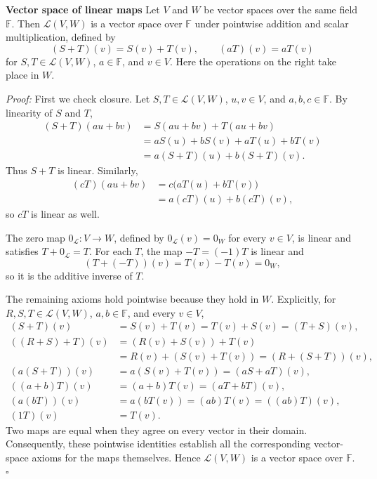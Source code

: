 \documentclass[a4paper,11pt,abstract=true]{scrartcl}
\theoremstyle{dotlessP}
\theoremstyle{dotlessS}
\theoremstyle{remark}
\theoremstyle{definition}
\begin{document}
\begin{problem_box}
\textbf{Vector space of linear maps}
Let $V$ and $W$
be vector spaces over the same field $\mathbb{F}$. Then
$\mathcal{L}(V,W)$ is a vector space over $\mathbb{F}$ under pointwise
addition and scalar multiplication, defined by
\[
(S+T)(v)=S(v)+T(v),
\qquad (aT)(v)=aT(v)
\]
for $S,T\in\mathcal{L}(V,W)$, $a\in\mathbb{F}$, and $v\in V$.
Here the operations on the right take place in $W$.
\end{problem_box}

\begin{claim_box}
\textit{Proof:} First we check closure. Let $S,T\in\mathcal{L}(V,W)$,
$u,v\in V$, and $a,b,c\in\mathbb{F}$. By linearity of $S$ and $T$,
\[
\begin{aligned}
(S+T)(au+bv)
&=S(au+bv)+T(au+bv)\\
&=aS(u)+bS(v)+aT(u)+bT(v)\\
&=a(S+T)(u)+b(S+T)(v).
\end{aligned}
\]
Thus $S+T$ is linear. Similarly,
\[
\begin{aligned}
(cT)(au+bv)
&=c\bigl(aT(u)+bT(v)\bigr)\\
&=a(cT)(u)+b(cT)(v),
\end{aligned}
\]
so $cT$ is linear as well.

The zero map $0_{\mathcal{L}}:V\longrightarrow W$, defined by
$0_{\mathcal{L}}(v)=0_W$ for every $v\in V$, is linear and satisfies
$T+0_{\mathcal{L}}=T$. For each $T$, the map $-T=(-1)T$ is linear and
\[
(T+(-T))(v)=T(v)-T(v)=0_W,
\]
so it is the additive inverse of $T$.

The remaining axioms hold pointwise because they hold in $W$. Explicitly,
for $R,S,T\in\mathcal{L}(V,W)$, $a,b\in\mathbb{F}$, and every $v\in V$,
\[
\begin{aligned}
(S+T)(v)&=S(v)+T(v)=T(v)+S(v)=(T+S)(v),\\
((R+S)+T)(v)&=(R(v)+S(v))+T(v)\\
&=R(v)+(S(v)+T(v))=(R+(S+T))(v),\\
(a(S+T))(v)&=a(S(v)+T(v))=(aS+aT)(v),\\
((a+b)T)(v)&=(a+b)T(v)=(aT+bT)(v),\\
(a(bT))(v)&=a(bT(v))=(ab)T(v)=((ab)T)(v),\\
(1T)(v)&=T(v).
\end{aligned}
\]
Two maps are equal when they agree on every vector in their domain.
Consequently, these pointwise identities establish all the corresponding
vector-space axioms for the maps themselves. Hence $\mathcal{L}(V,W)$ is
a vector space over $\mathbb{F}$. \hfill$\square$
\end{claim_box}
\end{document}
